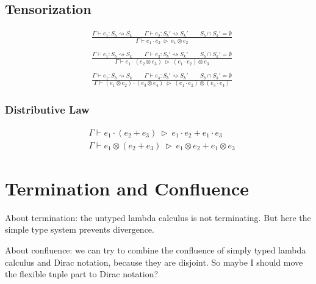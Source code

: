 \subsection*{Tensorization}
\begin{align*}
  & \frac{\Gamma \vdash e_1 : S_b \rightsquigarrow S_k \qquad \Gamma \vdash e_2 : S_b' \rightsquigarrow S_k' \qquad S_b \cap S_k' = \emptyset }{\Gamma \vdash e_1 \cdot e_2 \ \triangleright\ e_1 \otimes e_2}\\
  &\ \\
  & \frac{\Gamma \vdash e_1 : S_b \rightsquigarrow S_k \qquad \Gamma \vdash e_3 : S_b' \rightsquigarrow S_k' \qquad S_b \cap S_k' = \emptyset }{\Gamma \vdash e_1 \cdot (e_2 \otimes e_3) \ \triangleright\ (e_1 \cdot e_2) \otimes e_3}\\
  &\ \\
  & \frac{\Gamma \vdash e_1 : S_b \rightsquigarrow S_k \qquad \Gamma \vdash e_4 : S_b' \rightsquigarrow S_k' \qquad S_b \cap S_k' = \emptyset }{\Gamma \vdash (e_1 \otimes e_2) \cdot (e_3 \otimes e_4) \ \triangleright\ (e_1 \cdot e_2) \otimes (e_3 \cdot e_4)}
\end{align*}


\subsubsection*{Distributive Law}
\begin{align*}
  & \Gamma \vdash e_1 \cdot (e_2 + e_3) \ \triangleright\ e_1 \cdot e_2 + e_1 \cdot e_3 \\
  & \Gamma \vdash e_1 \otimes (e_2 + e_3) \ \triangleright\ e_1 \otimes e_2 + e_1 \otimes e_3
\end{align*}

\section{Termination and Confluence}

About termination: the untyped lambda calculus is not terminating. But here the simple type system prevents divergence.

About confluence: we can try to combine the confluence of simply typed lambda calculus and Dirac notation, because they are disjoint. So maybe I should move the flexible tuple part to Dirac notation?




